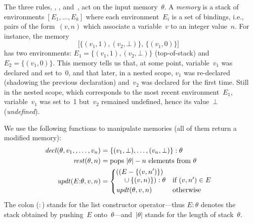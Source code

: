 
The three rules, , , and~, act on the input
memory~$\theta$.  A \emph{memory} is a stack of environments
$[E_1,\dots,E_k]$ where each environment~$E_i$ is a set of bindings, i.e.,
pairs of the form~$(v,n)$ which associate a variable~$v$ to an integer
value~$n$.  For instance, the memory
\[
  \big[\{(v_1,1),(v_2,\bot)\},\,\{(v_1,0)\}\big]
\]
has two environments: $E_1=\{(v_1,1),(v_2,\bot)\}$ (top-of-stack)
and~$E_2=\{(v_1,0)\}$.  This memory tells us that, at some point,
variable~$v_1$ was declared and set to~0, and that later, in a nested scope,
$v_1$ was re-declared (shadowing the previous declaration) and~$v_2$ was
declared for the first time.  Still in the nested scope, which corresponds
to the most recent environment~$E_1$, variable~$v_1$ was set to~1 but~$v_2$
remained undefined, hence its value~$\bot$ (\emph{undefined}).

\strut{}

We use the following functions to manipulate memories (all of them return a
modified memory):
\begin{align*}
  \memdecl(\theta,v_1,,\dots,v_n)
  &=\{(v_1,\bot),\dots,(v_n,\bot)\}:\theta\\
  \memrest(\theta,n)
  &=\text{pops $\left|\theta\right|-n$ elements from~$\theta$}\\
  \memupdt(E{:}\theta,v,n)
  &=\begin{cases}
    \begin{aligned}[b]
      &((E-\{(v,n')\})\\
      &\quad\null\cup\{(v,n)\}):\theta
    \end{aligned}
    &\text{if~$(v,n')\in{E}$}\\
    \memupdt(\theta,v,n)
    &\text{otherwise}
  \end{cases}
\end{align*}
The colon ($:$) stands for the list constructor operator---thus $E{:}\theta$
denotes the stack obtained by pushing~$E$
onto~$\theta$---and~$\left|\theta\right|$ stands for the length of
stack~$\theta$.


